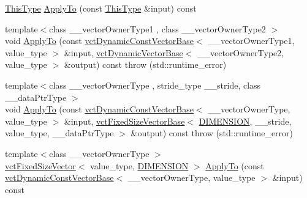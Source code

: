 \begin{DoxyCompactItemize}
\item 
\hyperlink{classvct_matrix_rotation3_const_base_ad26bf016ce37ea0532e1ce0aa7bba8a0}{This\+Type} \hyperlink{classvct_matrix_rotation3_const_base_a9a85987ac0bfca124f712bfab3be3ea5}{Apply\+To} (const \hyperlink{classvct_matrix_rotation3_const_base_ad26bf016ce37ea0532e1ce0aa7bba8a0}{This\+Type} \&input) const 
\item 
{\footnotesize template$<$class \+\_\+\+\_\+vector\+Owner\+Type1 , class \+\_\+\+\_\+vector\+Owner\+Type2 $>$ }\\void \hyperlink{classvct_matrix_rotation3_const_base_a517c1c190581dfe39a9565fdcf5a0d44}{Apply\+To} (const \hyperlink{classvct_dynamic_const_vector_base}{vct\+Dynamic\+Const\+Vector\+Base}$<$ \+\_\+\+\_\+vector\+Owner\+Type1, value\+\_\+type $>$ \&input, \hyperlink{classvct_dynamic_vector_base}{vct\+Dynamic\+Vector\+Base}$<$ \+\_\+\+\_\+vector\+Owner\+Type2, value\+\_\+type $>$ \&output) const   throw (std\+::runtime\+\_\+error)
\item 
{\footnotesize template$<$class \+\_\+\+\_\+vector\+Owner\+Type , stride\+\_\+type \+\_\+\+\_\+stride, class \+\_\+\+\_\+data\+Ptr\+Type $>$ }\\void \hyperlink{classvct_matrix_rotation3_const_base_a422584ee6e316eb5d2dc607728130d24}{Apply\+To} (const \hyperlink{classvct_dynamic_const_vector_base}{vct\+Dynamic\+Const\+Vector\+Base}$<$ \+\_\+\+\_\+vector\+Owner\+Type, value\+\_\+type $>$ \&input, \hyperlink{classvct_fixed_size_vector_base}{vct\+Fixed\+Size\+Vector\+Base}$<$ \hyperlink{classvct_matrix_rotation3_const_base_a6bc9712dde55ee3fca0d7880feb6a903afdf02f4ad230d81f0ca2539c7feb61f3}{D\+I\+M\+E\+N\+S\+I\+O\+N}, \+\_\+\+\_\+stride, value\+\_\+type, \+\_\+\+\_\+data\+Ptr\+Type $>$ \&output) const   throw (std\+::runtime\+\_\+error)
\item 
{\footnotesize template$<$class \+\_\+\+\_\+vector\+Owner\+Type $>$ }\\\hyperlink{classvct_fixed_size_vector}{vct\+Fixed\+Size\+Vector}$<$ value\+\_\+type, \hyperlink{classvct_matrix_rotation3_const_base_a6bc9712dde55ee3fca0d7880feb6a903afdf02f4ad230d81f0ca2539c7feb61f3}{D\+I\+M\+E\+N\+S\+I\+O\+N} $>$ \hyperlink{classvct_matrix_rotation3_const_base_a97666c7b686e6a3c632aace4611a4e0e}{Apply\+To} (const \hyperlink{classvct_dynamic_const_vector_base}{vct\+Dynamic\+Const\+Vector\+Base}$<$ \+\_\+\+\_\+vector\+Owner\+Type, value\+\_\+type $>$ \&input) const 
\item 

\end{DoxyCompactItemize}
